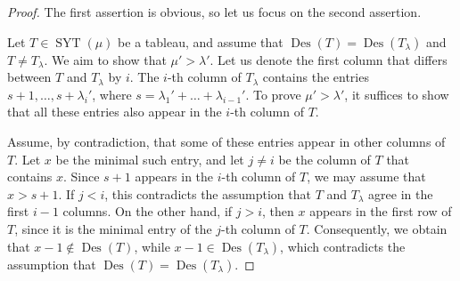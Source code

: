 \documentclass[11pt]{article}
\theoremstyle{definition}
\numberwithin{equation}{section}
\newcommand{\Des}{\operatorname{Des}}
\newcommand{\Syt}{\operatorname{SYT}}
\begin{document}
\begin{proof}
    The first assertion is obvious, so let us focus on the second assertion.
    
    Let $T \in \Syt(\mu)$ be a tableau, and assume that $\Des(T) = \Des(T_\lambda)$ and $T \ne T_\lambda$. We aim to show that $\mu' > \lambda'$. Let us denote the first column that differs between $T$ and $T_\lambda$ by $i$. The $i$-th column of $T_\lambda$ contains the entries $s+1,\dots,s+\lambda_{i}'$, where $s = \lambda_1' + \dots + \lambda_{i-1}'$. To prove $\mu' > \lambda'$, it suffices to show that all these entries also appear in the $i$-th column of $T$.
    
    Assume, by contradiction, that some of these entries appear in other columns of $T$. Let $x$ be the minimal such entry, and let $j \ne i$ be the column of $T$ that contains $x$. Since $s+1$ appears in the $i$-th column of $T$, we may assume that $x > s+1$. If $j < i$, this contradicts the assumption that $T$ and $T_\lambda$ agree in the first $i-1$ columns. On the other hand, if $j > i$, then $x$ appears in the first row of $T$, since it is the minimal entry of the $j$-th column of $T$. Consequently, we obtain that $x-1 \notin \Des(T)$, while $x-1 \in \Des(T_\lambda)$, which contradicts the assumption that $\Des(T) = \Des(T_\lambda)$.
\end{proof}
\end{document}
